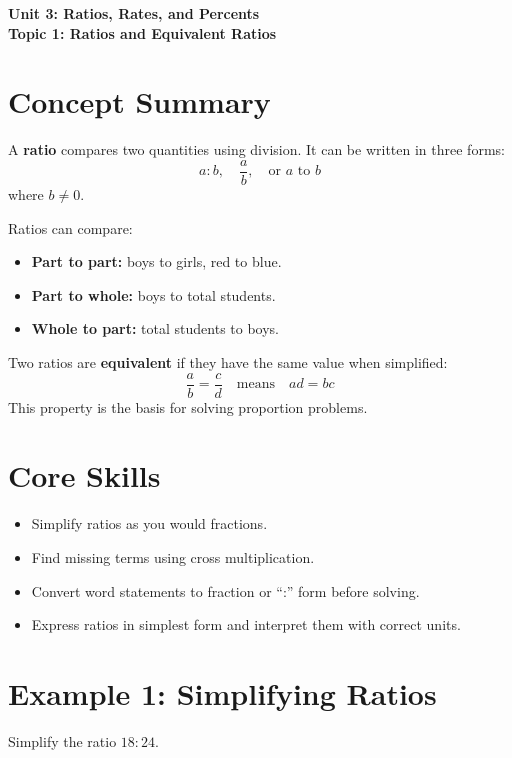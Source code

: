 \documentclass[12pt]{article}
\begin{document}
\begin{center}
    \LARGE \textbf{Unit 3: Ratios, Rates, and Percents} \\[6pt]
    \Large \textbf{Topic 1: Ratios and Equivalent Ratios}
\end{center}

\vspace{1em}

\section*{Concept Summary}

A \textbf{ratio} compares two quantities using division.  
It can be written in three forms:
\[
a:b, \quad \frac{a}{b}, \quad \text{or } a \text{ to } b
\]
where \(b \ne 0\).

Ratios can compare:
\begin{itemize}
    \item \textbf{Part to part:} boys to girls, red to blue.
    \item \textbf{Part to whole:} boys to total students.
    \item \textbf{Whole to part:} total students to boys.
\end{itemize}

Two ratios are \textbf{equivalent} if they have the same value when simplified:
\[
\frac{a}{b} = \frac{c}{d}
\quad \text{means} \quad ad = bc
\]
This property is the basis for solving proportion problems.

\section*{Core Skills}
\begin{itemize}
    \item Simplify ratios as you would fractions.
    \item Find missing terms using cross multiplication.
    \item Convert word statements to fraction or “:” form before solving.
    \item Express ratios in simplest form and interpret them with correct units.
\end{itemize}

\section*{Example 1: Simplifying Ratios}

Simplify the ratio \(18:24\).
\end{document}
